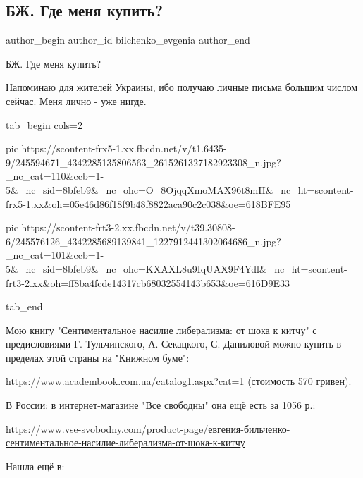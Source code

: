  
 
 
 
 
 
\subsection{БЖ. Где меня купить?}
\label{sec:14_10_2021.fb.bilchenko_evgenia.1.gde_menja_kupitj}
 
\ifcmt
 author_begin
   author_id bilchenko_evgenia
 author_end
\fi

БЖ. Где меня купить? 

Напоминаю для жителей Украины, ибо получаю личные письма большим числом сейчас.
Меня лично - уже нигде. 

\ifcmt
  tab_begin cols=2

     pic https://scontent-frx5-1.xx.fbcdn.net/v/t1.6435-9/245594671_4342285135806563_2615261327182923308_n.jpg?_nc_cat=110&ccb=1-5&_nc_sid=8bfeb9&_nc_ohc=O_8OjqqXmoMAX96t8mH&_nc_ht=scontent-frx5-1.xx&oh=05e46d86f18f9b48f8822aca90c2c038&oe=618BFE95

     pic https://scontent-frt3-2.xx.fbcdn.net/v/t39.30808-6/245576126_4342285689139841_1227912441302064686_n.jpg?_nc_cat=101&ccb=1-5&_nc_sid=8bfeb9&_nc_ohc=KXAXL8u9IqUAX9F4Ydl&_nc_ht=scontent-frt3-2.xx&oh=ff8ba4fcde14317cb68032554143b653&oe=616D9E33

  tab_end
\fi

Мою книгу "Сентиментальное насилие либерализма: от шока к китчу" с
предисловиями Г. Тульчинского, А. Секацкого, С. Даниловой можно купить в
пределах этой страны на "Книжном буме":

\url{https://www.academbook.com.ua/catalog1.aspx?cat=1} (стоимость 570 гривен).

В России: в интернет-магазине "Все свободны" она ещё есть за 1056 р.: 

\url{https://www.vse-svobodny.com/product-page/евгения-бильченко-сентиментальное-насилие-либерализма-от-шока-к-китчу}

Нашла ещё в: 

